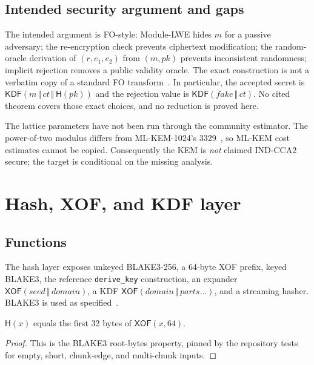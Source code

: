 \documentclass[runningheads]{llncs}
\newcommand{\concat}{\,\Vert\,}
\newcommand{\Hash}{\mathsf{H}}
\newcommand{\XOF}{\mathsf{XOF}}
\newcommand{\KDF}{\mathsf{KDF}}
\begin{document}
\subsection{Intended security argument and gaps}

The intended argument is FO-style: Module-LWE hides $m$ for a passive
adversary; the re-encryption check prevents ciphertext modification; the
random-oracle derivation of $(r,e_1,e_2)$ from $(m,pk)$ prevents
inconsistent randomness; implicit rejection removes a public validity
oracle.  The exact construction is not a verbatim copy of a standard FO
transform~\cite{fo99,hhk17}.  In particular, the accepted secret is
$\KDF(m\concat ct\concat\Hash(pk))$ and the rejection value is
$\KDF(\mathit{fake}\concat ct)$.  No cited theorem covers those exact
choices, and no reduction is proved here.

The lattice parameters have not been run through the community
estimator.  The power-of-two modulus differs from ML-KEM-1024's
3329~\cite{fips203}, so ML-KEM cost estimates cannot be copied.
Consequently the KEM is \emph{not} claimed IND-CCA2 secure; the target
is conditional on the missing analysis.

\section{Hash, XOF, and KDF layer}
\label{sec:hash}

\subsection{Functions}

The hash layer exposes unkeyed BLAKE3-256, a 64-byte XOF prefix,
keyed BLAKE3, the reference \texttt{derive\_key} construction, an
expander $\XOF(\mathit{seed}\concat\mathit{domain})$, a KDF
$\XOF(\mathit{domain}\concat\mathit{parts}\ldots)$, and a streaming
hasher.  BLAKE3 is used as specified~\cite{blake3}.

\begin{lemma}
$\Hash(x)$ equals the first 32 bytes of $\XOF(x,64)$.
\end{lemma}

\begin{proof}
This is the BLAKE3 root-bytes property, pinned by the repository tests
for empty, short, chunk-edge, and multi-chunk inputs.
\end{proof}
\end{document}
